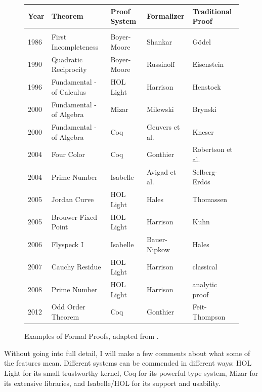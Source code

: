 \documentclass{llncs}
\begin{document}
\begin{figure}[h!]
\centering
\begin{tabular}{l l l l l}
\hline
Year\hspace{0.5em} &Theorem\hspace{8em} &Proof System\hspace{2em}  &Formalizer\hspace{3em} &Traditional Proof\\ [0.5ex]
\hline \\
1986 &First Incompleteness &Boyer-Moore   &Shankar &G\"odel \\
1990 &Quadratic Reciprocity&Boyer-Moore &Russinoff &Eisenstein\\
1996 &Fundamental - of Calculus &HOL Light &Harrison &Henstock\\
2000 &Fundamental - of Algebra &Mizar &Milewski    &Brynski\\ 
2000 &Fundamental - of Algebra &Coq &Geuvers et al.   &Kneser\\
2004 &Four Color &Coq &Gonthier &Robertson et al.\\
2004 &Prime Number &Isabelle &Avigad et al. &Selberg-Erd\"os\\
2005 &Jordan Curve  &HOL Light &Hales &Thomassen \\
2005 &Brouwer Fixed Point &HOL Light &Harrison &Kuhn \\
2006 &Flyspeck I &Isabelle &Bauer-Nipkow &Hales \\
2007 &Cauchy Residue &HOL Light &Harrison &classical \\
2008 &Prime Number &HOL Light &Harrison &analytic proof \\
2012 &Odd Order Theorem&Coq&Gonthier&Feit-Thompson\\
 [1ex]
\hline
\end{tabular}
\caption{Examples of Formal Proofs, adapted from \cite{Hales:2008:formal}.}
\label{fig:table}
\end{figure}


Without going into full detail, I will make a few comments about what
some of the features mean.  Different systems can be commended in
different ways: HOL Light for its small trustworthy kernel, Coq for
its powerful type system, Mizar for its extensive libraries, and
Isabelle/HOL for its support and usability.
\end{document}
